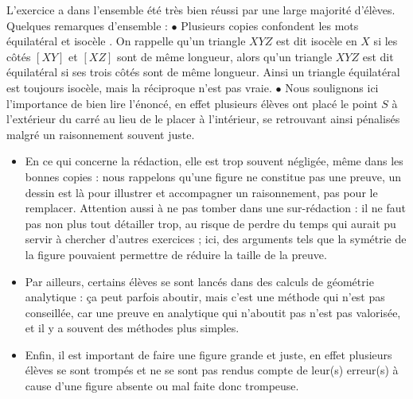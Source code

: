 L'exercice a dans l'ensemble été très bien réussi par une large majorité d'élèves. Quelques remarques d'ensemble : \newline $\bullet$ Plusieurs copies confondent les mots \og équilatéral \fg et \og isocèle \fg. On rappelle qu'un triangle $XYZ$ est dit isocèle en $X$ si les côtés $[XY]$ et $[XZ]$ sont de même longueur, alors qu'un triangle $XYZ$ est dit équilatéral si ses trois côtés sont de même longueur. Ainsi un triangle équilatéral est toujours isocèle, mais la réciproque n'est pas vraie. \newline $\bullet$ Nous soulignons ici l'importance de bien lire l'énoncé, en effet plusieurs élèves ont placé le point $S$ à l'extérieur du carré au lieu de le placer à l'intérieur, se retrouvant ainsi pénalisés malgré un raisonnement souvent juste.
\begin{itemize}
\item En ce qui concerne la rédaction, elle est trop souvent négligée, même dans les bonnes copies : nous rappelons qu'une figure ne constitue pas une preuve, un dessin est là pour illustrer et accompagner un raisonnement, pas pour le remplacer. Attention aussi à ne pas tomber dans une sur-rédaction : il ne faut pas non plus tout détailler trop, au risque de perdre du temps qui aurait pu servir à chercher d'autres exercices ; ici, des arguments tels que la symétrie de la figure pouvaient permettre de réduire la taille de la preuve.
\item Par ailleurs, certains élèves se sont lancés dans des calculs de géométrie analytique : ça peut parfois aboutir, mais c'est une méthode qui n'est pas conseillée, car une preuve en analytique qui n'aboutit pas n'est pas valorisée, et il y a souvent des méthodes plus simples.
\item Enfin, il est important de faire une figure grande et juste, en effet plusieurs élèves se sont trompés et ne se sont pas rendus compte de leur(s) erreur(s) à cause d'une figure absente ou mal faite donc trompeuse.
\end{itemize}